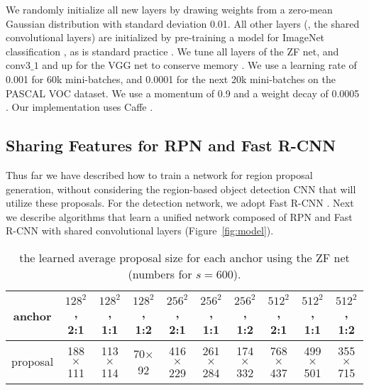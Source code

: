 \documentclass[10pt,journal,cspaper,compsoc]{IEEEtran}
\begin{document}
We randomly initialize all new layers by drawing weights from a zero-mean Gaussian distribution with standard deviation 0.01. All other layers (\ie, the shared convolutional layers) are initialized by pre-training a model for ImageNet classification \cite{Russakovsky2015}, as is standard practice \cite{Girshick2014}. We tune all layers of the ZF net, and conv3$\_1$ and up for the VGG net to conserve memory \cite{Girshick2015a}.
We use a learning rate of 0.001 for 60k mini-batches, and 0.0001 for the next 20k mini-batches on the PASCAL VOC dataset. We use a momentum of 0.9 and a weight decay of 0.0005 \cite{Krizhevsky2012}. Our implementation uses Caffe \cite{Jia2014}.

\subsection{Sharing Features for RPN and Fast R-CNN}
\label{sec:training}

Thus far we have described how to train a network for region proposal generation, without considering the region-based object detection CNN that will utilize these proposals.
For the detection network, we adopt Fast R-CNN \cite{Girshick2015a}.
Next we describe algorithms that learn a unified network composed of RPN and Fast R-CNN with shared convolutional layers (Figure~\ref{fig:model}).

\setlength{\tabcolsep}{3pt}
\renewcommand{\arraystretch}{1.1}
\begin{table*}[t]
\begin{center}
\caption{the learned average proposal size for each anchor using the ZF net (numbers for $s=600$).}
\vspace{-1em}
\small
\begin{tabular}{c||c|c|c||c|c|c||c|c|c}
  anchor & $128^2$, 2:1 & $128^2$, 1:1 & $128^2$, 1:2 & $256^2$, 2:1  & $256^2$, 1:1 & $256^2$, 1:2  & $512^2$, 2:1  & $512^2$, 1:1  & $512^2$, 1:2  \\
  \hline
  proposal & 188$\times$111 & 113$\times$114 & 70$\times$92 & 416$\times$229 & 261$\times$284 & 174$\times$332 & 768$\times$437 & 499$\times$501 & 355$\times$715  \\
\end{tabular}
\label{tab:anchorsZF}
\end{center}
\end{table*}
\end{document}
